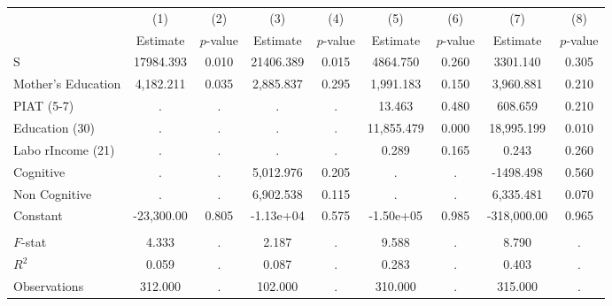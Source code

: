 \begin{tabular}{lcccccccc} \toprule
 & (1) & (2) & (3) & (4) & (5) & (6) & (7) & (8) \\ 
 & Estimate  & $p$-value  & Estimate  & $p$-value  & Estimate  & $p$-value  & Estimate  & $p$-value  \\  \midrule
S & 17984.393 &     0.010 & 21406.389 &     0.015 &  4864.750 &     0.260 &  3301.140 &     0.305 \\  
Mother's Education &  4,182.211 &     0.035 &  2,885.837 &     0.295 &  1,991.183 &     0.150 &  3,960.881 &     0.210 \\  
PIAT (5-7) &         . &         . &         . &         . &    13.463 &     0.480 &   608.659 &     0.210 \\  
Education (30) &         . &         . &         . &         . & 11,855.479 &     0.000 & 18,995.199 &     0.010 \\  
Labo rIncome (21) &         . &         . &         . &         . &     0.289 &     0.165 &     0.243 &     0.260 \\  
Cognitive &         . &         . &  5,012.976 &     0.205 &         . &         . & -1498.498 &     0.560 \\  
Non Cognitive &         . &         . &  6,902.538 &     0.115 &         . &         . &  6,335.481 &     0.070 \\  
Constant & -23,300.00 &     0.805 & -1.13e+04 &     0.575 & -1.50e+05 &     0.985 & -318,000.00 &     0.965 \\ \\ \midrule  
$F$-stat &     4.333 &         . &     2.187 &         . &     9.588 &         . &     8.790 &         . \\  
$R^2$ &     0.059 &         . &     0.087 &         . &     0.283 &         . &     0.403 &         . \\  
Observations &   312.000 &         . &   102.000 &         . &   310.000 &         . &   315.000 &         . \\  
\bottomrule \end{tabular}
